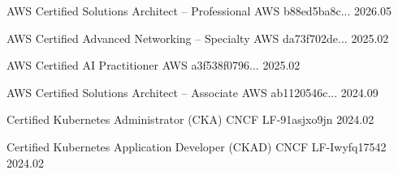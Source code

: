 

\begin{cvhonors}
  \cvhonor
    {AWS Certified Solutions Architect – Professional} %
    {AWS} %
    {b88ed5ba8c...} %
    {2026.05} %

  \cvhonor
    {AWS Certified Advanced Networking – Specialty} %
    {AWS} %
    {da73f702de...} %
    {2025.02} %

  \cvhonor
    {AWS Certified AI Practitioner} %
    {AWS} %
    {a3f538f0796...} %
    {2025.02} %

  \cvhonor
    {AWS Certified Solutions Architect – Associate} %
    {AWS} %
    {ab1120546c...} %
    {2024.09} %

  \cvhonor
    {Certified Kubernetes Administrator (CKA)} %
    {CNCF} %
    {LF-91asjxo9jn} %
    {2024.02} %

  \cvhonor
    {Certified Kubernetes Application Developer (CKAD)} %
    {CNCF} %
    {LF-Iwyfq17542} %
    {2024.02} %

\end{cvhonors}

